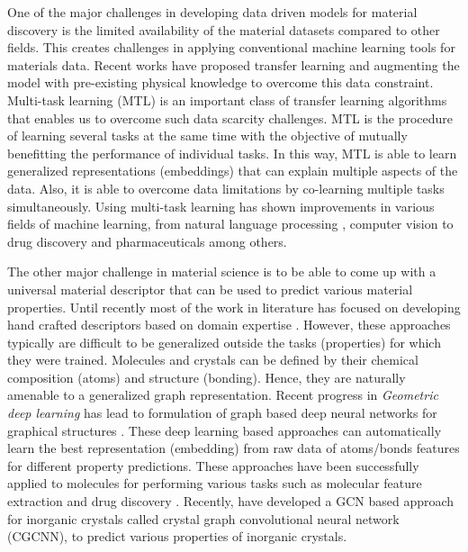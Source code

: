 \documentclass{article}
\newcommand{\baseline}[1]{CGCNN}
\begin{document}
One of the major challenges in developing data driven models for material discovery is the limited availability of the material datasets compared to other fields. This creates challenges in applying conventional machine learning tools for materials data. Recent works have proposed transfer learning \cite{Meredig17} and augmenting the model with pre-existing physical knowledge \cite{narendrakumarMachineLearningConstrained} to overcome this data constraint. Multi-task learning (MTL) is an important class of transfer learning algorithms that enables us to overcome such data scarcity challenges. MTL is the procedure of learning several tasks at the same time with the objective of mutually benefitting the performance of individual tasks. In this way, MTL is able to learn generalized representations (embeddings) that can explain multiple aspects of the data. Also, it is able to overcome data limitations by co-learning multiple tasks simultaneously. Using multi-task learning has shown improvements in various fields of machine learning, from natural language processing \citep{Collobert08}, computer vision \citep{Girshick15} to drug discovery \citep{Ramsundar15} and pharmaceuticals \cite{Ramsundar17} among others.

The other major challenge in material science is to be able to come up with a universal material descriptor that can be used to predict various material properties. Until recently most of the work in literature has focused on developing  hand crafted descriptors based on domain expertise \cite{HuangCommunicationUnderstandingmolecular2016,BartokGaussianapproximationpotentials2015}. However, these approaches typically are difficult to be generalized outside the tasks (properties) for which they were trained. Molecules and crystals can be defined by their chemical composition (atoms) and structure (bonding). Hence, they are naturally amenable to a generalized graph representation. Recent progress in \textit{Geometric deep learning} \citep{gdl17} has lead to formulation of graph based deep neural networks for graphical structures \citep{gnn05,gnn09,Kipf2016, gcn_iclr14}. These deep learning based approaches can automatically learn the best representation (embedding) from raw data of atoms/bonds features for different property predictions. These approaches have been successfully applied to molecules for performing various tasks such as molecular feature extraction \citep{DuvenaudMAGHAA15,gcn_camd16, mpnn_icml17} and drug discovery \citep{lddd_acs17}.  Recently, \citet{CGCNN} have developed a GCN based approach for inorganic crystals called crystal graph convolutional neural network (\baseline{}), to predict various properties of inorganic crystals.
\end{document}
